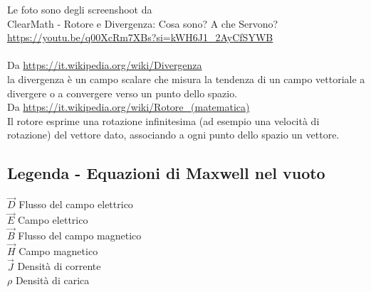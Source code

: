 \begin{tcolorbox}
    Le foto sono degli screenshoot da \\
    ClearMath - Rotore e Divergenza: Cosa sono? A che Servono? \\ 
    \url{https://youtu.be/q00XcRm7XBs?si=kWH6J1_2AyCfSYWB} \\\\ 
     
    Da \url{https://it.wikipedia.org/wiki/Divergenza} \\ 
    la divergenza è un campo scalare che misura la tendenza di un campo vettoriale a divergere o a convergere verso un punto dello spazio. \\ 

    Da \url{https://it.wikipedia.org/wiki/Rotore_(matematica)} \\ 
    Il rotore esprime una rotazione infinitesima (ad esempio una velocità di rotazione) del vettore dato, associando a ogni punto dello spazio un vettore.
\end{tcolorbox}
\newpage

\subsection{Legenda - Equazioni di Maxwell nel vuoto}

$\vec{D}$ Flusso del campo elettrico \\ 
$\vec{E}$ Campo elettrico \\ 
$\vec{B}$ Flusso del campo magnetico \\ 
$\vec{H}$ Campo magnetico \\
$\vec{J}$ Densità di corrente \\ 
$\rho$ Densità di carica \\\\ 

